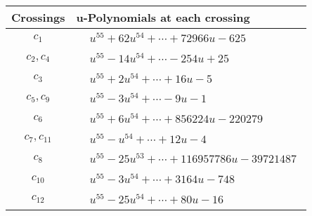 \documentclass[1p]{elsarticle_modified}
\theoremstyle{definition}
\begin{document}
\begin{tabular}{m{50pt}|m{274pt}}
Crossings & \hspace{64pt}u-Polynomials at each crossing \\
\hline $$\begin{aligned}c_{1}\end{aligned}$$&$\begin{aligned}
&u^{55}+62 u^{54}+\cdots+72966 u-625
\end{aligned}$\\
\hline $$\begin{aligned}c_{2},c_{4}\end{aligned}$$&$\begin{aligned}
&u^{55}-14 u^{54}+\cdots-254 u+25
\end{aligned}$\\
\hline $$\begin{aligned}c_{3}\end{aligned}$$&$\begin{aligned}
&u^{55}+2 u^{54}+\cdots+16 u-5
\end{aligned}$\\
\hline $$\begin{aligned}c_{5},c_{9}\end{aligned}$$&$\begin{aligned}
&u^{55}-3 u^{54}+\cdots-9 u-1
\end{aligned}$\\
\hline $$\begin{aligned}c_{6}\end{aligned}$$&$\begin{aligned}
&u^{55}+6 u^{54}+\cdots+856224 u-220279
\end{aligned}$\\
\hline $$\begin{aligned}c_{7},c_{11}\end{aligned}$$&$\begin{aligned}
&u^{55}- u^{54}+\cdots+12 u-4
\end{aligned}$\\
\hline $$\begin{aligned}c_{8}\end{aligned}$$&$\begin{aligned}
&u^{55}-25 u^{53}+\cdots+116957786 u-39721487
\end{aligned}$\\
\hline $$\begin{aligned}c_{10}\end{aligned}$$&$\begin{aligned}
&u^{55}-3 u^{54}+\cdots+3164 u-748
\end{aligned}$\\
\hline $$\begin{aligned}c_{12}\end{aligned}$$&$\begin{aligned}
&u^{55}-25 u^{54}+\cdots+80 u-16
\end{aligned}$\\
\hline
\end{tabular}\\~\\
\end{document}
